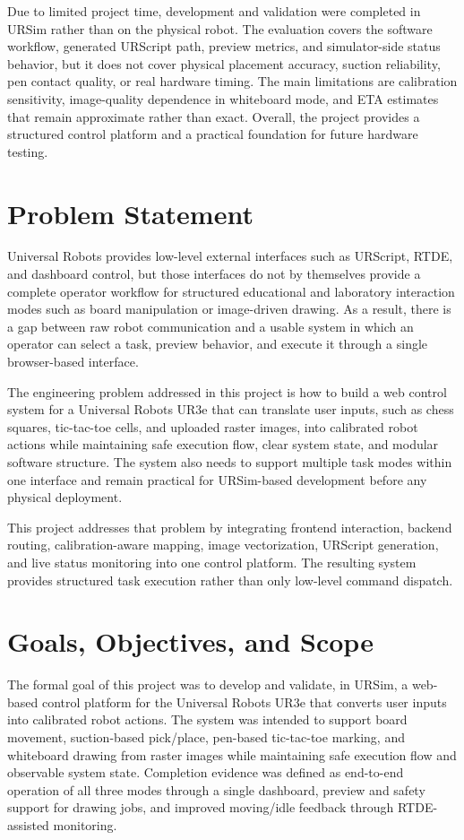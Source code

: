 \documentclass[12pt]{article}
\begin{document}
Due to limited project time, development and validation were completed in URSim rather than on the physical robot. The evaluation covers the software workflow, generated URScript path, preview metrics, and simulator-side status behavior, but it does not cover physical placement accuracy, suction reliability, pen contact quality, or real hardware timing. The main limitations are calibration sensitivity, image-quality dependence in whiteboard mode, and ETA estimates that remain approximate rather than exact. Overall, the project provides a structured control platform and a practical foundation for future hardware testing.

\newpage
{}

\section{Problem Statement}
Universal Robots provides low-level external interfaces such as URScript, RTDE, and dashboard control, but those interfaces do not by themselves provide a complete operator workflow for structured educational and laboratory interaction modes such as board manipulation or image-driven drawing. As a result, there is a gap between raw robot communication and a usable system in which an operator can select a task, preview behavior, and execute it through a single browser-based interface.

The engineering problem addressed in this project is how to build a web control system for a Universal Robots UR3e that can translate user inputs, such as chess squares, tic-tac-toe cells, and uploaded raster images, into calibrated robot actions while maintaining safe execution flow, clear system state, and modular software structure. The system also needs to support multiple task modes within one interface and remain practical for URSim-based development before any physical deployment.

This project addresses that problem by integrating frontend interaction, backend routing, calibration-aware mapping, image vectorization, URScript generation, and live status monitoring into one control platform. The resulting system provides structured task execution rather than only low-level command dispatch.

\section{Goals, Objectives, and Scope}
The formal goal of this project was to develop and validate, in URSim, a web-based control platform for the Universal Robots UR3e that converts user inputs into calibrated robot actions. The system was intended to support board movement, suction-based pick/place, pen-based tic-tac-toe marking, and whiteboard drawing from raster images while maintaining safe execution flow and observable system state. Completion evidence was defined as end-to-end operation of all three modes through a single dashboard, preview and safety support for drawing jobs, and improved moving/idle feedback through RTDE-assisted monitoring.
\end{document}

